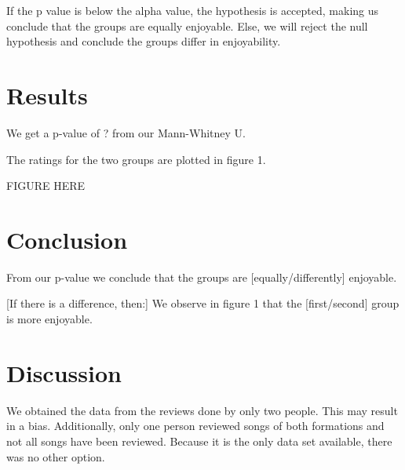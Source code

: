 \documentclass{article}
\begin{document}
If the p value is below the alpha value,
the hypothesis is accepted, making us conclude
that the groups are equally enjoyable.
Else, we will reject the null hypothesis
and conclude the groups differ in enjoyability.

\section{Results}

We get a p-value of ? from our 
Mann-Whitney U. 

The ratings for the two groups are plotted in
figure 1. 

FIGURE HERE

\section{Conclusion}
From our p-value we conclude that 
the groups are [equally/differently] enjoyable.

[If there is a difference, then:]
We observe in figure 1 that the [first/second] 
group is more enjoyable.

\section{Discussion}

We obtained the data from the reviews done
by only two people. This may result in
a bias. 
Additionally, only one person reviewed
songs of both formations and not all
songs have been reviewed.
Because it is the only data
set available, there was no other option.
\end{document}
